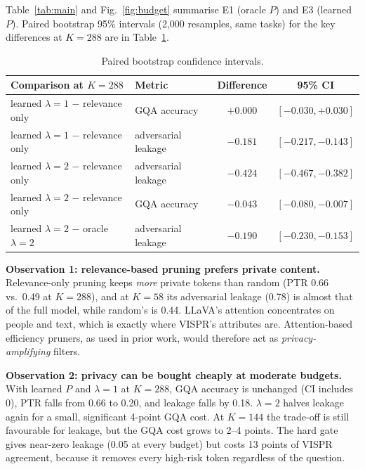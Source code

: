 \documentclass[10pt]{article}
\renewcommand{\Pr}{P}
\begin{document}
Table~\ref{tab:main} and Fig.~\ref{fig:budget} summarise E1 (oracle $\Pr$) and E3 (learned $\Pr$). Paired bootstrap 95\% intervals (2,000 resamples, same tasks) for the key differences at $K{=}288$ are in Table~\ref{tab:ci}.

\begin{table}[h]
\centering\small
\begin{tabular}{@{}llcc@{}}
\toprule
Comparison at $K{=}288$ & Metric & Difference & 95\% CI \\
\midrule
learned $\lambda{=}1$ $-$ relevance only & GQA accuracy & $+0.000$ & $[-0.030,+0.030]$ \\
learned $\lambda{=}1$ $-$ relevance only & adversarial leakage & $-0.181$ & $[-0.217,-0.143]$ \\
learned $\lambda{=}2$ $-$ relevance only & adversarial leakage & $-0.424$ & $[-0.467,-0.382]$ \\
learned $\lambda{=}2$ $-$ relevance only & GQA accuracy & $-0.043$ & $[-0.080,-0.007]$ \\
learned $\lambda{=}2$ $-$ oracle $\lambda{=}2$ & adversarial leakage & $-0.190$ & $[-0.230,-0.153]$ \\
\bottomrule
\end{tabular}
\caption{Paired bootstrap confidence intervals.}
\label{tab:ci}
\vspace{-1em}
\end{table}

\textbf{Observation 1: relevance-based pruning prefers private content.} Relevance-only pruning keeps \emph{more} private tokens than random (PTR 0.66 vs.\ 0.49 at $K{=}288$), and at $K{=}58$ its adversarial leakage (0.78) is almost that of the full model, while random's is 0.44.
LLaVA's attention concentrates on people and text, which is exactly where VISPR's attributes are. Attention-based efficiency pruners, as used in prior work, would therefore act as \emph{privacy-amplifying} filters.

\textbf{Observation 2: privacy can be bought cheaply at moderate budgets.} With learned $\Pr$ and $\lambda{=}1$ at $K{=}288$, GQA accuracy is unchanged (CI includes 0), PTR falls from 0.66 to 0.20, and leakage falls by 0.18.
$\lambda{=}2$ halves leakage again for a small, significant 4-point GQA cost. At $K{=}144$ the trade-off is still favourable for leakage, but the GQA cost grows to 2--4 points.
The hard gate gives near-zero leakage (0.05 at every budget) but costs 13 points of VISPR agreement, because it removes every high-risk token regardless of the question.
\end{document}
